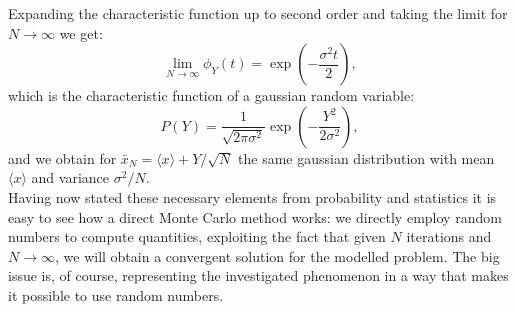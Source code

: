 Expanding the characteristic function up to second order and taking the limit for $N\to\infty$ we get:
\begin{equation}
    \lim_{N\to\infty}\phi_Y(t)=\exp\left(-\frac{\sigma^2t}{2}\right),
\end{equation}
which is the characteristic function of a gaussian random variable:
\begin{equation}
    P(Y)=\frac{1}{\sqrt{2\pi\sigma^2}}\exp{\left(-\frac{Y^2}{2\sigma^2}\right)},
\end{equation}
and we obtain for $\bar{x}_N=\langle x \rangle + Y/\sqrt{N}$ the same gaussian distribution with mean $\langle x \rangle$ and variance 
$\sigma^2/N$.\\
Having now stated these necessary elements from probability and statistics it is easy to see how a direct Monte Carlo method works: we directly 
employ random numbers to compute quantities, exploiting the fact that given $N$ iterations and $N\to\infty$, we will obtain a convergent solution 
for the modelled problem. The big issue is, of course, representing the investigated phenomenon in a way that makes it possible to use 
random numbers.
